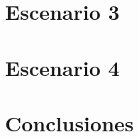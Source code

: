 \documentclass[%
	final,
	notitlepage,
	narroweqnarray,
	inline,
	twoside,
	]{ieee}
\newcommand{\latexiie}{\LaTeX2{\Large$_\varepsilon$}}
\begin{document}
\section{Escenario 3}
	

\section{Escenario 4}
	

\section{Conclusiones}
	



%
%
%
%
%

\end{document}
